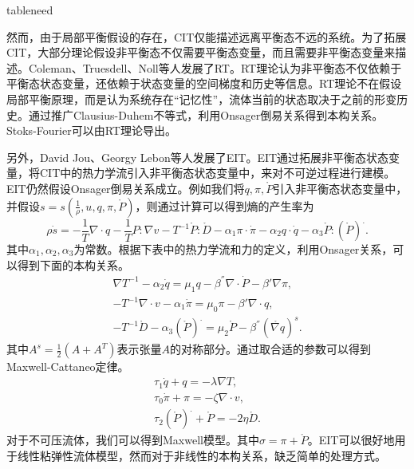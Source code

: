 \documentclass{article}
\begin{document}
tableneed

然而，由于局部平衡假设的存在，CIT仅能描述远离平衡态不远的系统。为了拓展CIT，大部分理论假设非平衡态不仅需要平衡态变量，而且需要非平衡态变量来描述。Coleman、Truesdell、Noll等人发展了RT。RT理论认为非平衡态不仅依赖于平衡态状态变量，还依赖于状态变量的空间梯度和历史等信息。RT理论不在假设局部平衡原理，而是认为系统存在“记忆性”，流体当前的状态取决于之前的形变历史。通过推广Clausius-Duhem不等式，利用Onsager倒易关系得到本构关系。Stoks-Fourier可以由RT理论导出\cite{jou1996extended}。

另外，David Jou、Georgy Lebon等人发展了EIT。EIT通过拓展非平衡态状态变量，将CIT中的热力学流引入非平衡态状态变量中，来对不可逆过程进行建模。EIT仍然假设Onsager倒易关系成立。例如我们将$q,\pi,\mathring{P}$引入非平衡态状态变量中，并假设$s = s(\frac{1}{\rho}, u,q,\pi,\mathring{P} )$，则通过计算可以得到熵的产生率为
\begin{equation*}
		\rho \dot{s} = - \frac{1}{T} \nabla \cdot q - \frac{1}{T} P: \nabla v - T^{-1} \mathring{P} : \mathring{D} - \alpha_1 \pi \cdot \dot{\pi} - \alpha_2 q \cdot \dot{q} - \alpha_3 \mathring{P} : ({\mathring{P} })^. .
\end{equation*}
其中$\alpha_1,\alpha_2,\alpha_3$为常数。根据下表中的热力学流和力的定义，利用Onsager关系，可以得到下面的本构关系。
\begin{subequations} \label{eq:EITconstitutive}
		\begin{align}
	\nabla T^{-1} - \alpha_2 \dot{q} = \mu_1 q - \beta^{''}\nabla \cdot \dot{P} - \beta' \nabla \pi, \\
	-T^{-1} \nabla \cdot v - \alpha_1 \dot{\pi} = \mu_0 \pi - \beta' \nabla \cdot q , \\
	-T^{-1} \mathring{D} - \alpha_3 (\mathring{P})^. = \mu_2 \mathring{P} - \beta^{''} (\mathring{\nabla q})^s. 
		\end{align}
\end{subequations}
其中$A^s = \frac{1}{2} (A+A^T)$表示张量$A$的对称部分。通过取合适的参数可以得到Maxwell-Cattaneo定律。
\begin{eqnarray*}
	\tau_1 \dot{q} + q = - \lambda \nabla T, \\
 	\tau_0 \dot{\pi } + \pi = -\zeta \nabla \cdot v, \\
 	\tau_2 (\mathring{P})^. + \mathring{P} = -2 \eta \mathring{D}.
\end{eqnarray*}
对于不可压流体，我们可以得到Maxwell模型。其中$\sigma = \pi + \mathring{P} $。EIT可以很好地用于线性粘弹性流体模型，然而对于非线性的本构关系，缺乏简单的处理方式\cite{jou1996extended}。
\end{document}
